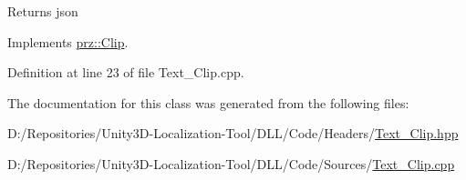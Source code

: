\begin{DoxyReturn}{Returns}
json 
\end{DoxyReturn}


Implements \mbox{\hyperlink{classprz_1_1_clip_a4959ada0fab0fbac6cb5239578ac3ec6}{prz\+::\+Clip}}.



Definition at line 23 of file Text\+\_\+\+Clip.\+cpp.



The documentation for this class was generated from the following files\+:\begin{DoxyCompactItemize}
\item 
D\+:/\+Repositories/\+Unity3\+D-\/\+Localization-\/\+Tool/\+D\+L\+L/\+Code/\+Headers/\mbox{\hyperlink{_text___clip_8hpp}{Text\+\_\+\+Clip.\+hpp}}\item 
D\+:/\+Repositories/\+Unity3\+D-\/\+Localization-\/\+Tool/\+D\+L\+L/\+Code/\+Sources/\mbox{\hyperlink{_text___clip_8cpp}{Text\+\_\+\+Clip.\+cpp}}\end{DoxyCompactItemize}
